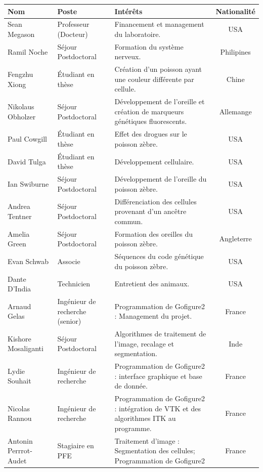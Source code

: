 {\small \begin{tabular*}{1.0\textwidth}{@{\extracolsep{\fill}} |  p{2.5cm} |  p{} | p{3.5cm} | c | }
\hline Nom & Poste & Intérêts & Nationalité \\ 
\hline Sean Megason & Professeur (Docteur) & Financement et management du laboratoire. & USA \\ 
\hline Ramil Noche & Séjour Postdoctoral & Formation du système nerveux. & Philipines \\ 
\hline Fengzhu Xiong & Étudiant en thèse & Création d'un poisson ayant une couleur différente par cellule. & Chine \\ 
\hline Nikolaus Obholzer & Séjour Postdoctoral & Développement de l'oreille et création de marqueurs génétiques fluorescents. &  Allemange \\ 
\hline Paul Cowgill & Étudiant en thèse & Effet des drogues sur le poisson zèbre. & USA \\ 
\hline David Tulga & Étudiant en thèse & Développement cellulaire. &  USA \\ 
\hline Ian Swiburne & Séjour Postdoctoral & Développement de l'oreille du poisson zèbre. & USA \\ 
\hline Andrea Tentner & Séjour Postdoctoral & Différenciation des cellules provenant d'un ancêtre commun. & USA \\ 
\hline Amelia Green & Séjour Postdoctoral & Formation des oreilles du poisson zèbre. & Angleterre \\ 
\hline Evan Schwab & Associe & Séquences du code génétique du poisson zèbre. & USA \\ 
\hline Dante D'India & Technicien & Entretient des animaux. & USA \\ 
\hline Arnaud Gelas & Ingénieur de recherche (senior) & Programmation de Gofigure2 : Management du projet. &  France \\
\hline Kishore Mosaliganti & Séjour Postdoctoral & Algorithmes de traitement de l'image, recalage et segmentation. & Inde \\ 
\hline Lydie Souhait & Ingénieur de recherche & Programmation de Gofigure2 : interface graphique et base de donnée. & France \\
\hline Nicolas Rannou & Ingénieur de recherche & Programmation de Gofigure2 : intégration de VTK et des algorithmes ITK au programme. & France \\
\hline Antonin Perrrot-Audet & Stagiaire en PFE & Traitement d'image : Segmentation des cellules; Programmation de Gofigure2 & France \\
\hline 
\end{tabular*} }

